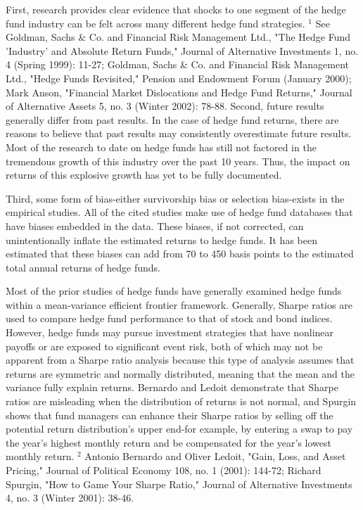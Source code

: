 \documentclass[11pt]{article}
\begin{document}
First, research provides clear evidence that shocks to one segment of the hedge fund industry can be felt across many different hedge fund strategies. ${ }^{1}$ See Goldman, Sachs \& Co. and Financial Risk Management Ltd., "The Hedge Fund 'Industry' and Absolute Return Funds," Journal of Alternative Investments 1, no. 4 (Spring 1999): 11-27; Goldman, Sachs \& Co. and Financial Risk Management Ltd., "Hedge Funds Revisited," Pension and Endowment Forum (January 2000); Mark Anson, "Financial Market Dislocations and Hedge Fund Returns," Journal of Alternative Assets 5, no. 3 (Winter 2002): 78-88. Second, future results generally differ from past results. In the case of hedge fund returns, there are reasons to believe that past results may consistently overestimate future results. Most of the research to date on hedge funds has still not factored in the tremendous growth of this industry over the past 10 years. Thus, the impact on returns of this explosive growth has yet to be fully documented.

Third, some form of bias-either survivorship bias or selection bias-exists in the empirical studies. All of the cited studies make use of hedge fund databases that have biases embedded in the data. These biases, if not corrected, can unintentionally inflate the estimated returns to hedge funds. It has been estimated that these biases can add from 70 to 450 basis points to the estimated total annual returns of hedge funds.

Most of the prior studies of hedge funds have generally examined hedge funds within a mean-variance efficient frontier framework. Generally, Sharpe ratios are used to compare hedge fund performance to that of stock and bond indices. However, hedge funds may pursue investment strategies that have nonlinear payoffs or are exposed to significant event risk, both of which may not be apparent from a Sharpe ratio analysis because this type of analysis assumes that returns are symmetric and normally distributed, meaning that the mean and the variance fully explain returns. Bernardo and Ledoit demonstrate that Sharpe ratios are misleading when the distribution of returns is not normal, and Spurgin shows that fund managers can enhance their Sharpe ratios by selling off the potential return distribution's upper end-for example, by entering a swap to pay the year's highest monthly return and be compensated for the year's lowest monthly return. ${ }^{2}$ Antonio Bernardo and Oliver Ledoit, "Gain, Loss, and Asset Pricing," Journal of Political Economy 108, no. 1 (2001): 144-72; Richard Spurgin, "How to Game Your Sharpe Ratio," Journal of Alternative Investments 4, no. 3 (Winter 2001): 38-46.
\end{document}
